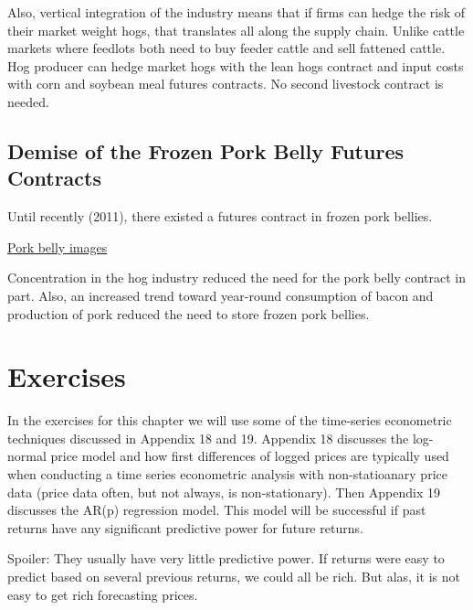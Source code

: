 \documentclass[
]{book}
\begin{document}
Also, vertical integration of the industry means that if firms can hedge the risk of their market weight hogs, that translates all along the supply chain. Unlike cattle markets where feedlots both need to buy feeder cattle and sell fattened cattle. Hog producer can hedge market hogs with the lean hogs contract and input costs with corn and soybean meal futures contracts. No second livestock contract is needed.

\hypertarget{demise-of-the-frozen-pork-belly-futures-contracts}{%
\subsection{Demise of the Frozen Pork Belly Futures Contracts}\label{demise-of-the-frozen-pork-belly-futures-contracts}}

Until recently (2011), there existed a futures contract in frozen pork bellies.

\href{https://www.google.com/search?q=pork+belly\&biw=1920\&bih=1075\&noj=1\&source=lnms\&tbm=isch\&sa=X\&ved=0CAgQ_AUoAmoVChMIhbO55IqdyQIVDNUeCh0_owNp}{Pork belly images}

Concentration in the hog industry reduced the need for the pork belly contract in part. Also, an increased trend toward year-round consumption of bacon and production of pork reduced the need to store frozen pork bellies.

\hypertarget{exercises-9}{%
\section{Exercises}\label{exercises-9}}

In the exercises for this chapter we will use some of the time-series econometric techniques discussed in Appendix 18 and 19. Appendix 18 discusses the log-normal price model and how first differences of logged prices are typically used when conducting a time series econometric analysis with non-statioanary price data (price data often, but not always, is non-stationary). Then Appendix 19 discusses the AR(p) regression model. This model will be successful if past returns have any significant predictive power for future returns.

Spoiler: They usually have very little predictive power. If returns were easy to predict based on several previous returns, we could all be rich. But alas, it is not easy to get rich forecasting prices.
\end{document}
